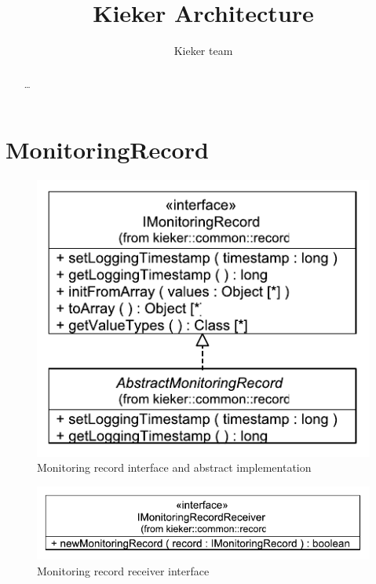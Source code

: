 \documentclass[12pt,journal,a4paper,twocolumn,final,oneside]{IEEEtran}%
\begin{document}
%

\setcounter{page}{1}

\title{%
Kieker Architecture%
}

\author{%
Kieker team
}

\maketitle

\begin{abstract}\small
\ldots
\end{abstract}

\section{MonitoringRecord}

\begin{figure}[h]\centering
\includegraphics[scale=0.65]{figures/model/kieker_MonitoringRecord}%
\caption{Monitoring record interface and abstract implementation}
\label{fig:record:IMonitoringRecordAndAbstractMonitoringRecord}
\end{figure}

\begin{figure}[h]\centering
\includegraphics[scale=0.65]{figures/model/kieker_IMonitoringRecordReceiver}%
\caption{Monitoring record receiver interface}
\label{fig:record:IMonitoringRecordReceiver}
\end{figure}
\end{document}
